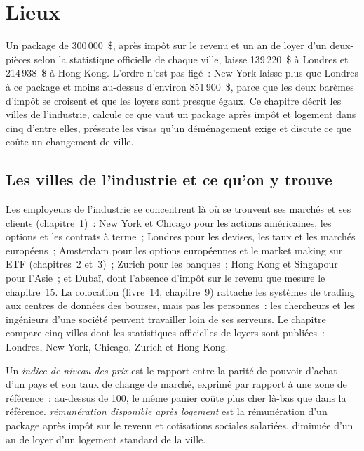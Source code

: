 \chapter{Lieux}\label{ch:in:locations}

Un package de 300\,000~\$, après impôt sur le revenu et un an de loyer d'un deux-pièces selon la statistique officielle de chaque ville, laisse
139\,220~\$ à Londres et 214\,938~\$ à Hong Kong. L'ordre n'est pas figé~: New York laisse plus que Londres à ce package et moins
au-dessus d'environ 851\,900~\$, parce que les deux barèmes d'impôt se croisent et que les loyers sont presque égaux. Ce chapitre
décrit les villes de l'industrie, calcule ce que vaut un package après impôt et logement dans cinq d'entre elles, présente les
visas qu'un déménagement exige et discute ce que coûte un changement de ville.

\section{Les villes de l'industrie et ce qu'on y trouve}

Les employeurs de l'industrie se concentrent là où se trouvent ses marchés et ses clients (chapitre~1)~: New York et Chicago pour les actions américaines,
les options et les contrats à terme~; Londres pour les devises, les taux et les marchés européens~; Amsterdam pour les options européennes et le market making
sur ETF (chapitres~2 et~3)~; Zurich pour les banques~; Hong Kong et Singapour pour l'Asie~; et Dubaï, dont l'absence d'impôt sur le revenu
que mesure le chapitre~15. La colocation (livre~14, chapitre~9) rattache les systèmes de trading aux
centres de données des bourses, mais pas les personnes~: les chercheurs et les ingénieurs d'une société peuvent travailler loin de ses serveurs. Le
chapitre compare cinq villes dont les statistiques officielles de loyers sont publiées~: Londres, New York, Chicago, Zurich et Hong Kong.

\begin{definition}\label{def:in:locations:pli}
Un \emph{indice de niveau des prix} est le rapport entre la parité de pouvoir d'achat d'un pays et son taux de change de marché,
exprimé par rapport à une zone de référence~: au-dessus de 100, le même panier coûte plus cher là-bas que dans la référence.
\emph{rémunération disponible après logement} est la rémunération d'un package après impôt sur le revenu et cotisations
sociales salariées, diminuée d'un an de loyer d'un logement standard de la ville.
\end{definition}

